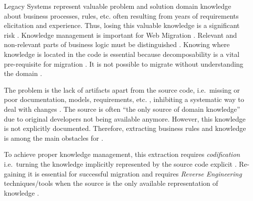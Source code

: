 \glspl{Legacy System} represent valuable problem and solution domain knowledge about business
processes, rules, etc.
\autocite{Aversano2001,Sneed2010SoftwareMigration,Wagner2014,Bodhuin2002DesktopWebMVC,Ulrich2011} often resulting from years of requirements elicitation and experience.
Thus, losing this valuable knowledge is a significant risk \autocite{Khadka2014ProfessionalsModernization}.
Knowledge management is important for \gls{Web Migration} \autocite{Razavian2010SAPIENSA,Razavian2013PHD}.
Relevant and non-relevant parts of business logic must be distinguished \autocite{Ulrich2011}.
Knowing where knowledge is located in the code is essential because decomposability is a vital pre-requisite for migration \autocite{Lucia2008,Canfora2000Decomposing,Brodie1995Migrating}.
It is not possible to migrate without understanding the domain \autocite{Masak2006}.
\vspace*{-5pt}

The problem is the lack of  \glspl{artifact} apart from the  source code, i.e.~missing or poor documentation, models, requirements, etc.
\autocite{Sneed2010SoftwareMigration,warren2012renaissance,Batlajery2014IndustrialSurveyModernization,Lucia2008}, inhibiting a systematic way to deal with changes \autocite{Sosa2014MigraSOA}.
The  source is often ``the only source of domain knowledge'' \autocite{Bodhuin2002DesktopWebMVC} due to original developers not being available anymore.
However, this knowledge is not explicitly documented. 
Therefore, extracting business rules and knowledge is among the main obstacles for  \autocite{Batlajery2014IndustrialSurveyModernization}.
\vspace*{-5pt}

To achieve proper knowledge management, this extraction requires \emph{codification} i.e.~turning the knowledge implicitly represented by the source code explicit \autocite{Hansen1999KnowledgeManagement}.
Re-gaining it is essential for successful migration and requires \emph{\gls{Reverse Engineering}} techniques/tools \autocite{Sneed2010SoftwareMigration} when the  source is the only available representation of knowledge \autocite{IEEE1219Maintenance}.
\vspace*{-5pt}


